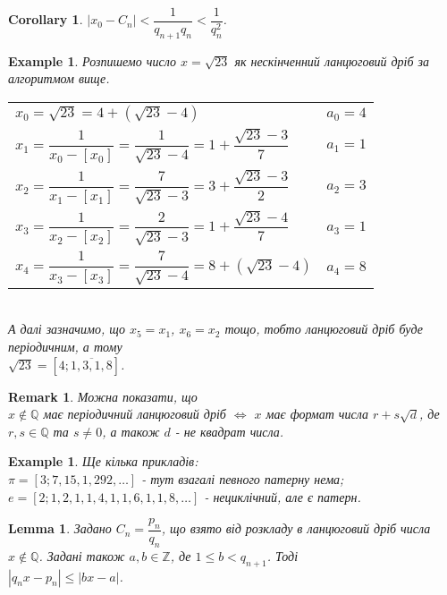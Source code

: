 \documentclass[a4paper, 14pt]{extarticle}
\theoremstyle{theoremdd}
\theoremstyle{theoremdd}
\theoremstyle{theoremdd}
\theoremstyle{theoremdd}
\newtheorem{example}[theorem]{Example}
\theoremstyle{theoremdd}
\theoremstyle{theoremdd}
\newtheorem{remark}[theorem]{Remark}
\theoremstyle{theoremdd}
\newtheorem{lemma}[theorem]{Lemma}
\theoremstyle{theoremdd}
\newtheorem{corollary}[theorem]{Corollary}
\begin{document}
\begin{corollary}
\label{if convergent, then estimation}
$\left| x_0 - C_n \right| < \dfrac{1}{q_{n+1}q_n} < \dfrac{1}{q_{n}^2}$.
\end{corollary}

\begin{example}
Розпишемо число $x = \sqrt{23}$ як нескінченний ланцюговий дріб за алгоритмом вище.\\
\begin{tabular}{ll}
$x_0 = \sqrt{23} = 4 + (\sqrt{23}-4)$ & $a_0 = 4$ \\
$x_1 = \dfrac{1}{x_0-[x_0]} = \dfrac{1}{\sqrt{23} - 4} = 1 + \dfrac{\sqrt{23} - 3}{7}$ & $a_1 = 1$\\
$x_2 = \dfrac{1}{x_1-[x_1]} = \dfrac{7}{\sqrt{23}-3} = 3 + \dfrac{\sqrt{23}-3}{2}$ & $a_2 = 3$\\
$x_3 = \dfrac{1}{x_2-[x_2]} = \dfrac{2}{\sqrt{23}-3} = 1 + \dfrac{\sqrt{23}-4}{7}$ & $a_3 = 1$\\
$x_4 = \dfrac{1}{x_3 - [x_3]} = \dfrac{7}{\sqrt{23} - 4} = 8 + (\sqrt{23}-4)$ & $a_4 = 8$
\end{tabular}\\
А далі зазначимо, що $x_5 = x_1$, $x_6 = x_2$ тощо, тобто ланцюговий дріб буде періодичним, а тому\\
$\sqrt{23} = [4;\overline{1,3,1,8}]$.
\end{example}

\begin{remark}
Можна показати, що \\
$x \not\in \mathbb{Q}$ має періодичний ланцюговий дріб $\iff$ $x$ має формат числа $r + s\sqrt{d}$, де $r,s \in \mathbb{Q}$ та $s \neq 0$, а також $d$ - не квадрат числа.
\end{remark}

\begin{example}
Ще кілька прикладів:\\
$\pi = [3;7,15,1,292,\dots]$ - тут взагалі певного патерну нема;\\
$e = [2;1,2,1,1,4,1,1,6,1,1,8,\dots]$ - нециклічний, але є патерн.
\end{example}

\begin{lemma}
Задано $C_n = \dfrac{p_n}{q_n}$, що взято від розкладу в ланцюговий дріб числа $x \not\in \mathbb{Q}$. Задані також $a,b \in \mathbb{Z}$, де $1 \leq b < q_{n+1}$. Тоді \\ $|q_nx - p_n| \leq |bx-a|$.
\end{lemma}
\end{document}
